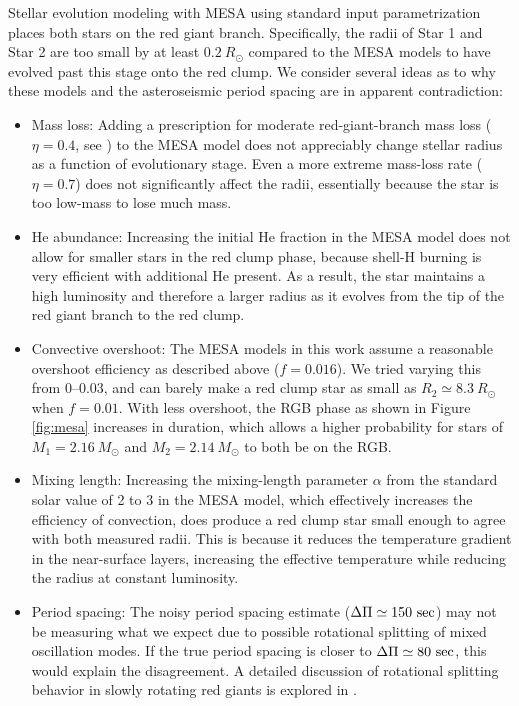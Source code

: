 Stellar evolution modeling with MESA using standard input parametrization places both stars on the red giant branch. Specifically, the radii of Star 1 and Star 2 are too small by at least $0.2 \ R_\odot$ compared to the MESA models to have evolved past this stage onto the red clump. We consider several ideas as to why these models and the asteroseismic period spacing are in apparent contradiction:
\begin{itemize}
\item Mass loss: Adding a prescription for moderate red-giant-branch mass loss ($\eta = 0.4$, see \citealt{mig12}) to the MESA model does not appreciably change stellar radius as a function of evolutionary stage. Even a more extreme mass-loss rate ($\eta = 0.7$) does not significantly affect the radii, essentially because the star is too low-mass to lose much mass.
\item He abundance: Increasing the initial He fraction in the MESA model does not allow for smaller stars in the red clump phase, because shell-H burning is very efficient with additional He present. As a result, the star maintains a high luminosity and therefore a larger radius as it evolves from the tip of the red giant branch to the red clump.
\item Convective overshoot: The MESA models in this work assume a reasonable overshoot efficiency as described above ($f = 0.016$). We tried varying this from 0--0.03, and can barely make a red clump star as small as $R_2 \simeq 8.3 \ R_\odot$ when $f = 0.01$. With less overshoot, the RGB phase as shown in Figure \ref{fig:mesa} increases in duration, which allows a higher probability for stars of $M_1 = 2.16 \ M_\odot$ and $M_2 = 2.14 \ M_\odot$ to both be on the RGB.
\item Mixing length: Increasing the mixing-length parameter $\alpha$ from the standard solar value of 2 to 3 in the MESA model, which effectively increases the efficiency of convection, does produce a red clump star small enough to agree with both measured radii. This is because it reduces the temperature gradient in the near-surface layers, increasing the effective temperature while reducing the radius at constant luminosity. 
\item Period spacing: The noisy period spacing estimate ($\Delta \Pi \simeq 150 \ \rm{sec}$) may not be measuring what we expect due to possible rotational splitting of mixed oscillation modes. If the true period spacing is closer to $\Delta \Pi \simeq 80 \ \rm{sec}$, this would explain the disagreement. A detailed discussion of rotational splitting behavior in slowly rotating red giants is explored in \citet{gou13}.
\end{itemize}
